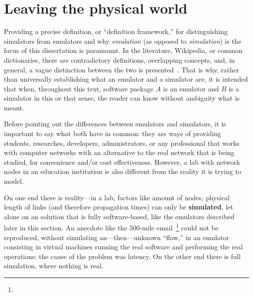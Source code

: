 
\chapter{Leaving the physical world}
\label{ch:leavingthephysicalworld}



Providing a precise definition, or ``definition framework,'' for distinguishing simulators from emulators and why \emph{emulation} (as opposed to \emph{simulation}) is the focus of this dissertation is paramount.
In the literature, Wikipedia, or common dictionaries, there are contradictory definitions, overlapping concepts, and, in general, a vague distinction between the two is presented~\cite{netsimoremu}. %
That is why, rather than universally establishing what an emulator and a simulator are, it is intended that when, throughout this text, software package $A$ is an emulator and $B$ is a simulator in this or that sense, the reader can know without ambiguity what is meant.


Before pointing out the differences between emulators and simulators, it is important to say what both have in common: they are ways of providing students, researches, developers, administrators, or any professional that works with computer networks with an alternative to the real network that is being studied, for convenience and/or cost effectiveness.
However, a lab with network nodes in an education institution is also different from the reality it is trying to model.

On one end there is reality---in a lab, factors like amount of nodes, physical length of links (and therefore propagation times) can only be \textbf{simulated}, let alone on an solution that is fully software-based, like the emulators described later in this section.
An anecdote like the 500-mile email~\footnote{} could not be reproduced, without simulating an---then---unknown ``flaw,'' in an emulator consisting in virtual machines running the real software and performing the real operations: the cause of the problem was latency.
On the other end there is full simulation, where nothing is real.

